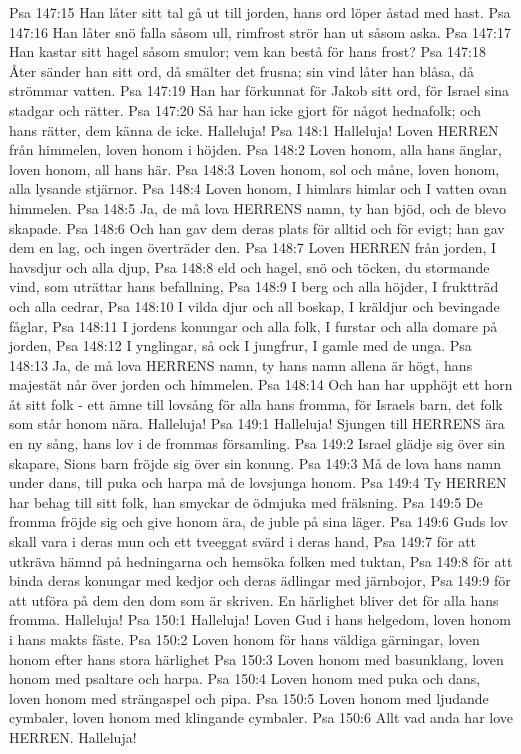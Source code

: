 Psa 147:15  Han låter sitt tal gå ut till jorden, hans ord löper åstad med hast.
Psa 147:16  Han låter snö falla såsom ull, rimfrost strör han ut såsom aska.
Psa 147:17  Han kastar sitt hagel såsom smulor; vem kan bestå för hans frost?
Psa 147:18  Åter sänder han sitt ord, då smälter det frusna; sin vind låter han blåsa, då strömmar vatten.
Psa 147:19  Han har förkunnat för Jakob sitt ord, för Israel sina stadgar och rätter.
Psa 147:20  Så har han icke gjort för något hednafolk; och hans rätter, dem känna de icke. Halleluja!
Psa 148:1  Halleluja! Loven HERREN från himmelen, loven honom i höjden.
Psa 148:2  Loven honom, alla hans änglar, loven honom, all hans här.
Psa 148:3  Loven honom, sol och måne, loven honom, alla lysande stjärnor.
Psa 148:4  Loven honom, I himlars himlar och I vatten ovan himmelen.
Psa 148:5  Ja, de må lova HERRENS namn, ty han bjöd, och de blevo skapade.
Psa 148:6  Och han gav dem deras plats för alltid och för evigt; han gav dem en lag, och ingen överträder den.
Psa 148:7  Loven HERREN från jorden, I havsdjur och alla djup,
Psa 148:8  eld och hagel, snö och töcken, du stormande vind, som uträttar hans befallning,
Psa 148:9  I berg och alla höjder, I fruktträd och alla cedrar,
Psa 148:10  I vilda djur och all boskap, I kräldjur och bevingade fåglar,
Psa 148:11  I jordens konungar och alla folk, I furstar och alla domare på jorden,
Psa 148:12  I ynglingar, så ock I jungfrur, I gamle med de unga.
Psa 148:13  Ja, de må lova HERRENS namn, ty hans namn allena är högt, hans majestät når över jorden och himmelen.
Psa 148:14  Och han har upphöjt ett horn åt sitt folk - ett ämne till lovsång för alla hans fromma, för Israels barn, det folk som står honom nära. Halleluja!
Psa 149:1  Halleluja! Sjungen till HERRENS ära en ny sång, hans lov i de frommas församling.
Psa 149:2  Israel glädje sig över sin skapare, Sions barn fröjde sig över sin konung.
Psa 149:3  Må de lova hans namn under dans, till puka och harpa må de lovsjunga honom.
Psa 149:4  Ty HERREN har behag till sitt folk, han smyckar de ödmjuka med frälsning.
Psa 149:5  De fromma fröjde sig och give honom ära, de juble på sina läger.
Psa 149:6  Guds lov skall vara i deras mun och ett tveeggat svärd i deras hand,
Psa 149:7  för att utkräva hämnd på hedningarna och hemsöka folken med tuktan,
Psa 149:8  för att binda deras konungar med kedjor och deras ädlingar med järnbojor,
Psa 149:9  för att utföra på dem den dom som är skriven. En härlighet bliver det för alla hans fromma. Halleluja!
Psa 150:1  Halleluja! Loven Gud i hans helgedom, loven honom i hans makts fäste.
Psa 150:2  Loven honom för hans väldiga gärningar, loven honom efter hans stora härlighet
Psa 150:3  Loven honom med basunklang, loven honom med psaltare och harpa.
Psa 150:4  Loven honom med puka och dans, loven honom med strängaspel och pipa.
Psa 150:5  Loven honom med ljudande cymbaler, loven honom med klingande cymbaler.
Psa 150:6  Allt vad anda har love HERREN. Halleluja!


